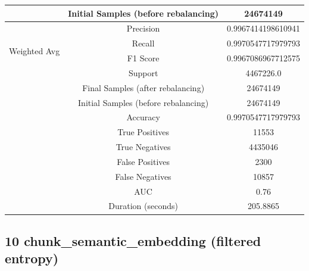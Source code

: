 \begin{longtable}{|c|c|c|}
 & Initial Samples (before rebalancing) & 24674149 \\
\hline
\multirow{4}{*}{Weighted Avg} & Precision & 0.9967414198610941 \\
 & Recall & 0.9970547717979793 \\
 & F1 Score & 0.9967086967712575 \\
 & Support & 4467226.0 \\
 & Final Samples (after rebalancing) & 24674149 \\
 & Initial Samples (before rebalancing) & 24674149 \\
\hline
& Accuracy & 0.9970547717979793 \\ \hline
& True Positives & 11553 \\ \hline
& True Negatives & 4435046 \\ \hline
& False Positives & 2300 \\ \hline
& False Negatives & 10857 \\ \hline
& AUC & 0.76 \\ \hline
& Duration (seconds) & 205.8865 \\ \hline
\end{longtable}


\subsection{10 chunk\_semantic\_embedding (filtered entropy)}

